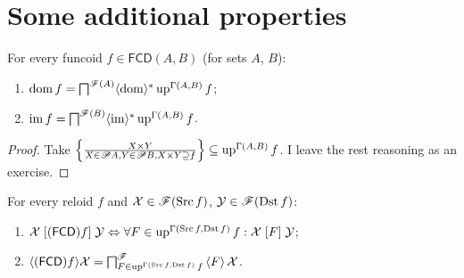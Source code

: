 \section{Some additional properties}
\begin{prop}
For every funcoid $f\in\mathsf{FCD}(A,B)$ (for sets $A$, $B$):
\begin{enumerate}
\item $\operatorname{dom} f=\bigsqcap^{\mathscr{F}(A)}\langle\operatorname{dom}\rangle^{\ast}\operatorname{up}^{\Gamma(A,B)}f$;
\item $\operatorname{im} f=\bigsqcap^{\mathscr{F}(B)}\langle\operatorname{im}\rangle^{\ast}\operatorname{up}^{\Gamma(A,B)}f$.
\end{enumerate}
\end{prop}
\begin{proof}
Take $\left\{ \frac{X\times Y}{X\in\mathscr{P} A,Y\in\mathscr{P} B,X\times Y\supseteq f}\right\}\subseteq\operatorname{up}^{\Gamma(A,B)}f$.
I leave the rest reasoning as an exercise.\end{proof}
\begin{thm}
For every reloid $f$ and $\mathcal{X}\in\mathscr{F}(\operatorname{Src} f)$, $\mathcal{Y}\in\mathscr{F}(\operatorname{Dst} f)$:
\begin{enumerate}
\item \label{fcd-up-g-rel}$\mathcal{X}\mathrel{[(\mathsf{FCD}) f]}\mathcal{Y}\Leftrightarrow\forall F\in\operatorname{up}^{\Gamma(\operatorname{Src} f,\operatorname{Dst} f)}f:\mathcal{X}\mathrel{\left[F\right]}\mathcal{Y}$;
\item \label{fcd-up-g-fcd}$\langle(\mathsf{FCD}) f\rangle\mathcal{X}=\bigsqcap_{F\in\operatorname{up}^{\Gamma(\operatorname{Src} f,\operatorname{Dst} f)}f}^{\mathscr{F}}\left\langle F\right\rangle\mathcal{X}$.
\end{enumerate}
\end{thm}
